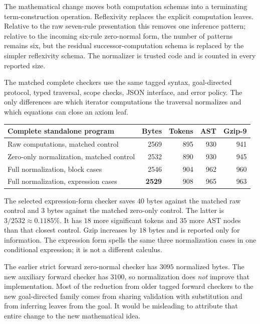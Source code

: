 The mathematical change moves both computation schemas into a terminating
term-construction operation. Reflexivity replaces the explicit computation
leaves. Relative to the raw seven-rule presentation this removes one
inference pattern; relative to the incoming six-rule zero-normal form,
the number of patterns remains six, but the residual successor-computation
schema is replaced by the simpler reflexivity schema.
The normalizer is trusted code and is counted in every reported size.

The matched complete checkers use the same tagged syntax, goal-directed
protocol, typed traversal, scope checks, JSON interface, and error policy.
The only differences are which iterator computations the traversal
normalizes and which equations can close an axiom leaf.

\begin{center}
\small
\begin{tabular}{@{}lrrrr@{}}
\toprule
Complete standalone program & Bytes & Tokens & AST & Gzip-9\\
\midrule
Raw computations, matched control & 2569 & 895 & 930 & 941\\
Zero-only normalization, matched control & 2532 & 890 & 930 & 945\\
Full normalization, block cases & 2546 & 904 & 962 & 960\\
Full normalization, expression cases & \textbf{2529} & 908 & 965 & 963\\
\bottomrule
\end{tabular}
\end{center}

The selected expression-form checker saves $40$ bytes against the matched
raw control and $3$ bytes against the matched zero-only control.
The latter is $3/2532\approx0.1185\%$. It has $18$ more significant tokens
and $35$ more AST nodes than that closest control. Gzip increases by
$18$ bytes and is reported only for information. The expression form spells
the same three normalization cases in one conditional expression; it is
not a different calculus.

The earlier strict forward zero-normal checker has $3095$ normalized bytes.
The new auxiliary forward checker has $3100$, so normalization does
\emph{not} improve that implementation. Most of the reduction from older
tagged forward checkers to the new goal-directed family comes from sharing
validation with substitution and from inferring leaves from the goal.
It would be misleading to attribute that entire change to the new
mathematical idea.

